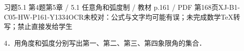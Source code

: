\begin{bankitem}{习题5.1 第4题}{第5章 / 5.1 任意角和弧度制 / 教材 p.161 / PDF 第168页}{XJ-B1-C05-HW-P161-Y1334}{OCR未校对：公式与文字均可能有误；未完成数学TeX转写；禁止直接发给学生}
\begin{ocrdraft}
\par
4．用角度和弧度分别写出第一、第二、第三、第四象限角的集合．
\end{ocrdraft}
\end{bankitem}
